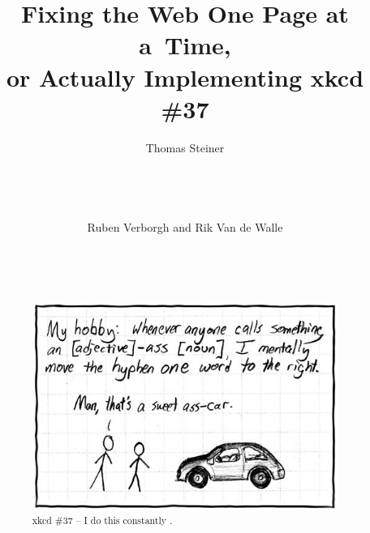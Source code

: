\documentclass{sig-alternate}
\begin{document}
\title{Fixing the Web One Page at a~Time,\\ or Actually Implementing xkcd \#37}

\author{
\alignauthor
Thomas Steiner\\
	\\
	\\
	\\
	\\
\alignauthor
Ruben Verborgh and Rik Van de Walle\\
	\\
	\\
	\\
}
\maketitle

\begin{abstract}
\begin{figure}[h!]
\centering
\includegraphics[width=\columnwidth]{hyphen.jpg}
\caption{xkcd \#37 -- I do this constantly \cite{xkcd37}.}
\label{fig:xkcd37}
\end{figure}
\end{abstract}

\end{document}
